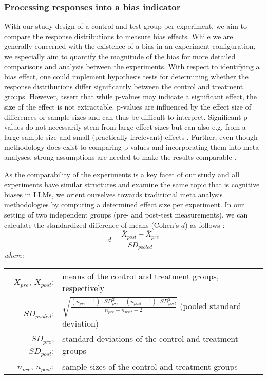 \subsubsection{Processing responses into a bias indicator}
\label{methodologies:biasdetector}
\par With our study design of a control and test group per experiment, we aim to compare the response distributions to measure bias effects. While we are generally concerned with the existence of a bias in an experiment configuration, we especially aim to quantify the magnitude of the bias for more detailed comparisons and analysis between the experiments. With respect to identifying a bias effect, one could implement hypothesis tests for determining whether the response distributions differ significantly between the control and treatment groups. However, \textcite{sullivan2012using} assert that while p-values may indicate a significant effect, the size of the effect is not extractable. p-values are influenced by the effect size of differences or sample sizes and can thus be difficult to interpret. Significant p-values do not necessarily stem from large effect sizes but can also e.g. from a large sample size and small (practically irrelevant) effects \parencite{borenstein2021introduction,sullivan2012using}. Further, even though methodology does exist to comparing p-values and incorporating them into meta analyses, strong assumptions are needed to make the results comparable \parencite{borenstein2021introduction}.

\par As the comparability of the experiments is a key facet of our study and all experiments have similar structures and examine the same topic that is cognitive biases in LLMs, we orient ourselves towards traditional meta analysis methodologies by computing a determined effect size per experiment. In our setting of two independent groups (pre- and post-test measurements), we can calculate the standardized difference of means (Cohen's $d$) as follows \parencite{borenstein2021introduction,cooper2019handbook, goulet2018review,morris2002combining, nakagawa2023quantitative}:
\begin{equation} \label{eq:cohensd}
d = \frac{\bar{X}_{post} - \bar{X}_{pre}}{SD_{pooled}}
\end{equation}
\hspace{0.5cm} \textit{where:} \\
\hspace*{3em}
\begin{tabular}{rl}
    $\bar{X}_{pre}$, $\bar{X}_{post}$:& means of the control and treatment groups, respectively \\
    $SD_{pooled}$:& $\sqrt{\frac{(n_{pre} - 1) \cdot SD_{pre}^2 + (n_{post} - 1) \cdot SD_{post}^2}{n_{pre} + n_{post} - 2}}$ (pooled standard deviation) \\
    $SD_{pre}$, $SD_{post}$:& standard deviations of the control and treatment groups \\
    $n_{pre}$, $n_{post}$:& sample sizes of the control and treatment groups
\end{tabular} \\

